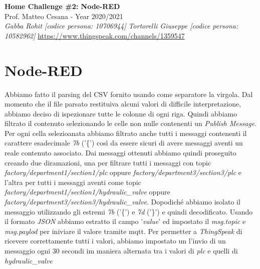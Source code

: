 \documentclass{article}
\begin{document}
\begin{titlepage}
   \begin{center}
      \Huge\textbf{Home Challenge \#2: Node-RED}\\
      \vspace{5mm} %
      \Large Prof. Matteo Cesana - Year 2020/2021\\
      \vspace{5mm} %
      \large\textit{Gabba Rohit [codice persona: 10706944]}
      \linebreak
      \large\textit{Tortorelli Giuseppe [codice persona: 10582962]}
      \linebreak
      \linebreak
      \linebreak
      \href{https://www.thingspeak.com/channels/1359547}{https://www.thingspeak.com/channels/1359547}
      \linebreak
   \end{center}
\end{titlepage}

\pagebreak
\section{Node-RED}
Abbiamo fatto il parsing del CSV fornito usando come separatore la virgola. Dal momento che il file parsato restituiva alcuni valori di difficile interpretazione,
abbiamo deciso di ispezionare tutte le colonne di ogni riga. \hfill \break \break
 Quindi abbiamo filtrato il contenuto selezionando le celle non nulle contenenti un \textit{Publish Message}. \hfill \break 
Per ogni cella selezioanata abbiamo filtrato anche tutti i messaggi contenenti il carattere esadecimale \textit{7b} ('\{')
così da essere sicuri di avere messaggi aventi un reale contenuto associato.\hfill \break \break
Dai messaggi ottenuti abbiamo quindi proseguito creando due diramazioni, una per filtrare tutti i messaggi con topic \textit{factory/department1/section1/plc} oppure 
\textit{factory/department3/section3/plc} e l'altra per tutti i messaggi aventi come topic \textit{factory/department1/section1/hydraulic\_valve} oppure 
\textit{factory/department3/section3/hydraulic\_valve}. \hfill \break
Dopodiché abbiamo isolato il messaggio utilizzando gli estremi \textit{7b} ('\{') e \textit{7d} ('\}') e quindi decodificato. \hfill \break
Usando il formato \textit{JSON} abbiamo estratto il campo '\textit{value}' ed impostato il \textit{msg.topic} e \textit{msg.paylod} per iniviare il valore tramite mqtt. \hfill \break \break
Per permetter a \textit{ThingSpeak} di ricevere correttamente tutti i valori, abbiamo impostato un l'invio di un messaggio ogni 30 secondi im maniera alternata tra i valori di \textit{plc} e quelli di  \textit{hydraulic\_valve}
\end{document}
